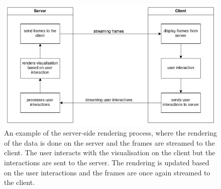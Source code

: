 \begin{figure}
    \centering
    \includegraphics[width=0.6\linewidth]{figures/server-side-rendering.jpg}
    \caption{An example of the server-side rendering process, where the rendering of the data is done on the server and the frames are streamed to the client. The user interacts with the visualisation on the client but the interactions are sent to the server. The rendering is updated based on the user interactions and the frames are once again streamed to the client.}
    \label{fig:server-rendering}
\end{figure}